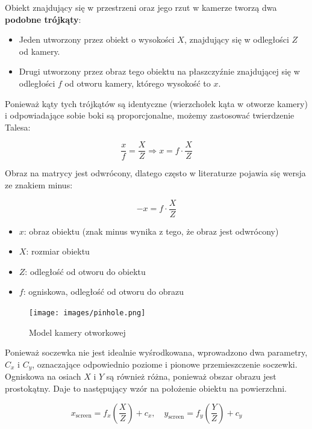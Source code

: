 \documentclass[magisterska]{pracadypl}
\begin{document}
Obiekt znajdujący się w przestrzeni oraz jego rzut w kamerze tworzą dwa \textbf{podobne trójkąty}:
\begin{itemize}
    \item Jeden utworzony przez obiekt o wysokości \( X \), znajdujący się w odległości \( Z \) od kamery.
    \item Drugi utworzony przez obraz tego obiektu na płaszczyźnie znajdującej się w odległości \( f \) od otworu kamery, którego wysokość to \( x \).
\end{itemize}

Ponieważ kąty tych trójkątów są identyczne (wierzchołek kąta w otworze kamery) i odpowiadające sobie boki są proporcjonalne, możemy zastosować twierdzenie Talesa:

\[
\frac{x}{f} = \frac{X}{Z} \Rightarrow x = f \cdot \frac{X}{Z}
\]

Obraz na matrycy jest odwrócony, dlatego często w literaturze pojawia się wersja ze znakiem minus:

\[
-x = f \cdot \frac{X}{Z}
\]

\begin{itemize}
  \item \textbf{$x$}: obraz obiektu (znak minus wynika z tego, że obraz jest odwrócony)
  \item \textbf{$X$}: rozmiar obiektu
  \item \textbf{$Z$}: odległość od otworu do obiektu
  \item \textbf{$f$}: ogniskowa, odległość od otworu do obrazu
\end{itemize}

\begin{figure}[H]  %
    \centering  %
    \texttt{[image: images/pinhole.png]}  %
    \captionsetup{font=footnotesize}
    \caption[Model kamery otworkowej. Learning OpenCV 3, O'Reilly, Str. 639]{Model kamery otworkowej}
    \label{fig:rpi}  %
\end{figure}

Ponieważ soczewka nie jest idealnie wyśrodkowana, wprowadzono dwa parametry, $C_x$ i $C_y$, oznaczające odpowiednio poziome i pionowe przemieszczenie soczewki.
Ogniskowa na osiach $X$ i $Y$ są również różna, ponieważ obszar obrazu jest prostokątny. Daje to następujący wzór na położenie obiektu na powierzchni.

\[
x_{\text{screen}} = f_x \left( \frac{X}{Z} \right) + c_x, \quad
y_{\text{screen}} = f_y \left( \frac{Y}{Z} \right) + c_y
\]
\end{document}
